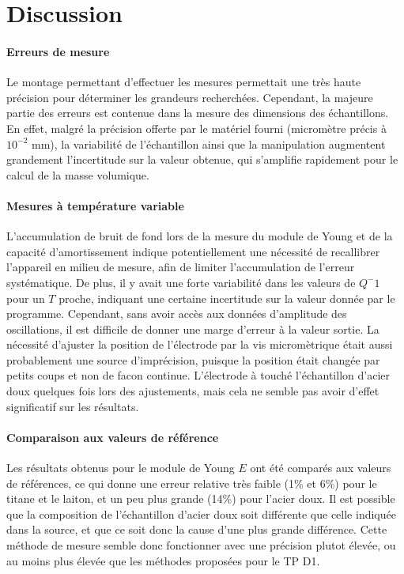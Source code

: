 \section{Discussion}

\paragraph{Erreurs de mesure} Le montage permettant d'effectuer les mesures permettait une très haute précision pour déterminer les grandeurs recherchées. Cependant, la majeure partie des erreurs est contenue dans la mesure des dimensions des échantillons. En effet, malgré la précision offerte par le matériel fourni (micromètre précis à \(10^{-2}\) \si{\milli\meter}), la variabilité de l'échantillon ainsi que la manipulation augmentent grandement l'incertitude sur la valeur obtenue, qui s'amplifie rapidement pour le calcul de la masse volumique.

\paragraph{Mesures à température variable} L'accumulation de bruit de fond lors de la mesure du module de Young et de la capacité d'amortissement indique potentiellement une nécessité de recallibrer l'appareil en milieu de mesure, afin de limiter l'accumulation de l'erreur systématique. De plus, il y avait une forte variabilité dans les valeurs de \(Q^-1\) pour un \(T\) proche, indiquant une certaine incertitude sur la valeur donnée par le programme. Cependant, sans avoir accès aux données d'amplitude des oscillations, il est difficile de donner une marge d'erreur à la valeur sortie. La nécessité d'ajuster la position de l'électrode par la vis micromètrique était aussi probablement une source d'imprécision, puisque la position était changée par petits coups et non de facon continue. L'électrode à touché l'échantillon d'acier doux quelques fois lors des ajustements, mais cela ne semble pas avoir d'effet significatif sur les résultats.

\paragraph{Comparaison aux valeurs de référence} Les résultats obtenus pour le module de Young \(E\) ont été comparés aux valeurs de références, ce qui donne une erreur relative très faible (1\% et 6\%) pour le titane et le laiton, et un peu plus grande (14\%) pour l'acier doux. Il est possible que la composition de l'échantillon d'acier doux soit différente que celle indiquée dans la source, et que ce soit donc la cause d'une plus grande différence. Cette méthode de mesure semble donc fonctionner avec une précision plutot élevée, ou au moins plus élevée que les méthodes proposées pour le TP D1.
